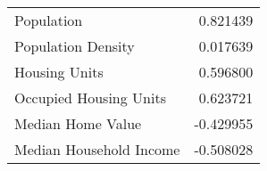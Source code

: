 \begin{tabular}{lr}
    Population                          & 0.821439                     \\
    Population Density                  & 0.017639                     \\
    Housing Units                       & 0.596800                     \\
    Occupied Housing Units              & 0.623721                     \\
    Median Home Value                   & -0.429955                    \\
    Median Household Income             & -0.508028                    \\
    \bottomrule
\end{tabular}
